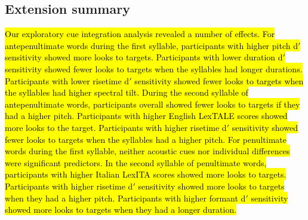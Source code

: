 \subsection{Extension summary}

\hl{Our exploratory cue integration analysis revealed a number of effects. For antepenultimate words during the first syllable, participants with higher pitch d$'$ sensitivity showed more looks to targets. Participants with lower duration d$'$ sensitivity showed fewer looks to targets when the syllables had longer durations. Participants with lower risetime d$'$ sensitivity showed fewer looks to targets when the syllables had higher spectral tilt. During the second syllable of antepenultimate words, participants overall showed fewer looks to targets if they had a higher pitch. Participants with higher English LexTALE scores showed more looks to the target. Participants with higher risetime d$'$ sensitivity showed fewer looks to targets when the syllables had a higher pitch. For penultimate words during the first syllable, neither acoustic cues nor individual differences were significant predictors. In the second syllable of penultimate words, participants with higher Italian LexITA scores showed more looks to targets. Participants with higher risetime d$'$ sensitivity showed more looks to targets when they had a higher pitch. Participants with higher formant d$'$ sensitivity showed more looks to targets when they had a longer duration.
}
